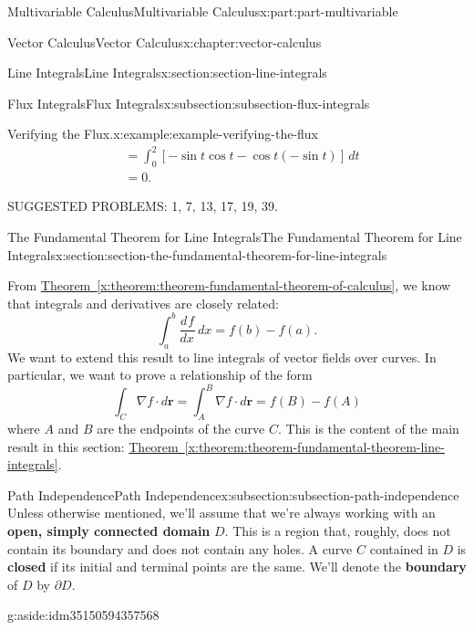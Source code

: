 \documentclass[twoside,10pt,]{book}
\newcommand{\xreffont}{\relax}
\newcommand{\terminology}[1]{\textbf{#1}}
\numberwithin{equation}{part}
\newcommand{\grad}{\nabla}
\newcommand{\vb}[1]{\mathbf{#1}}
\newcommand{\dv}[3][]{\dfrac{d^{#1} #2}{d #3^{#1}}}
\newcommand{\brackets}[1]{\left[ #1 \right]}
\newcommand{\amp}{&}
\begin{document}
\begin{partptx}{Multivariable Calculus}{}{Multivariable Calculus}{}{}{x:part:part-multivariable}
\begin{chapterptx}{Vector Calculus}{}{Vector Calculus}{}{}{x:chapter:vector-calculus}
\begin{sectionptx}{Line Integrals}{}{Line Integrals}{}{}{x:section:section-line-integrals}
\begin{subsectionptx}{Flux Integrals}{}{Flux Integrals}{}{}{x:subsection:subsection-flux-integrals}
\begin{example}{Verifying the Flux.}{x:example:example-verifying-the-flux}
\begin{align*}
\amp = \int_{0}^{2}\brackets{-\sin t\cos t - \cos t(-\sin t)}\,dt \\
\amp = 0 \text{.}
\end{align*}
%
\end{example}
\end{subsectionptx}
\begin{conclusion}{}%
SUGGESTED PROBLEMS: 1, 7, 13, 17, 19, 39.%
\end{conclusion}%
\end{sectionptx}
%
%
\typeout{************************************************}
\typeout{************************************************}
%
\begin{sectionptx}{The Fundamental Theorem for Line Integrals}{}{The Fundamental Theorem for Line Integrals}{}{}{x:section:section-the-fundamental-theorem-for-line-integrals}
\begin{introduction}{}%
From \hyperref[x:theorem:theorem-fundamental-theorem-of-calculus]{Theorem~{\xreffont\ref{x:theorem:theorem-fundamental-theorem-of-calculus}}}, we know that integrals and derivatives are closely related:%
\begin{equation*}
\int_{a}^{b}\dv{f}{x}\,dx = f(b) - f(a)\text{.}
\end{equation*}
We want to extend this result to line integrals of vector fields over curves. In particular, we want to prove a relationship of the form%
\begin{equation*}
\int_{C}\grad f\cdot d\vb{r} = \int_{A}^{B}\grad f\cdot d\vb{r} = f(B) - f(A)
\end{equation*}
where \(A\) and \(B\) are the endpoints of the curve \(C\). This is the content of the main result in this section: \hyperref[x:theorem:theorem-fundamental-theorem-line-integrals]{Theorem~{\xreffont\ref{x:theorem:theorem-fundamental-theorem-line-integrals}}}.%
\end{introduction}%
%
%
\typeout{************************************************}
\typeout{************************************************}
%
\begin{subsectionptx}{Path Independence}{}{Path Independence}{}{}{x:subsection:subsection-path-independence}
Unless otherwise mentioned, we'll assume that we're always working with an \terminology{open, simply connected domain} \(D\). This is a region that, roughly, does not contain its boundary and does not contain any holes. A curve \(C\) contained in \(D\) is \terminology{closed} if its initial and terminal points are the same. We'll denote the \terminology{boundary} of \(D\) by \(\partial D\). \begin{aside}{}{g:aside:idm35150594357568}%

\end{aside}
\end{subsectionptx}
\end{sectionptx}
\end{chapterptx}
\end{partptx}
\end{document}
